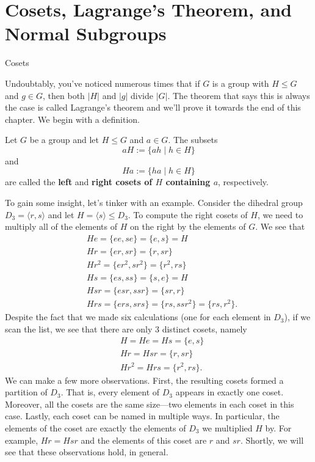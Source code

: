 \chapter{Cosets, Lagrange's Theorem, and Normal Subgroups}
\label{chapter:cosets_lagrange_normal}
\thispagestyle{empty}

\begin{section}{Cosets}

Undoubtably, you've noticed numerous times that if $G$ is a group with $H\leq G$ and $g\in G$, then both $|H|$ and $|g|$ divide $|G|$.  The theorem that says this is always the case is called Lagrange's theorem and we'll prove it towards the end of this chapter.  We begin with a definition.

\begin{definition}
Let $G$ be a group and let $H\leq G$ and $a\in G$.  The subsets
\[
aH:=\{ah\mid h\in H\}
\]
and
\[
Ha:=\{ha\mid h\in H\}
\]
are called the \textbf{left} and \textbf{right cosets of $H$ containing $a$}, respectively.
\end{definition}

To gain some insight, let's tinker with an example.  Consider the dihedral group $D_3=\langle r,s\rangle$ and let $H=\langle s\rangle\leq D_3$.  To compute the right cosets of $H$, we need to multiply all of the elements of $H$ on the right by the elements of $G$.  We see that
\begin{align*}
& He =\{ee,se\}=\{e,s\}=H\\
& Hr=\{er,sr\}=\{r,sr\}\\
& Hr^2=\{er^2,sr^2\}=\{r^2,rs\}\\
& Hs=\{es,ss\}=\{s,e\}=H\\
& Hsr=\{esr,ssr\}=\{sr,r\}\\
& Hrs=\{ers,srs\}=\{rs,ssr^2\}=\{rs,r^2\}.
\end{align*}
Despite the fact that we made six calculations (one for each element in $D_3$), if we scan the list, we see that there are only 3 distinct cosets, namely
\begin{align*}
& H=He=Hs=\{e,s\}\\
& Hr=Hsr=\{r,sr\}\\
& Hr^2=Hrs=\{r^2,rs\}.
\end{align*}
We can make a few more observations.  First, the resulting cosets formed a partition of $D_3$.  That is, every element of $D_3$ appears in exactly one coset.  Moreover, all the cosets are the same size---two elements in each coset in this case.  Lastly, each coset can be named in multiple ways.  In particular, the elements of the coset are exactly the elements of $D_3$ we multiplied $H$ by.  For example, $Hr=Hsr$ and the elements of this coset are $r$ and $sr$.  Shortly, we will see that these observations hold, in general.


\end{section}
